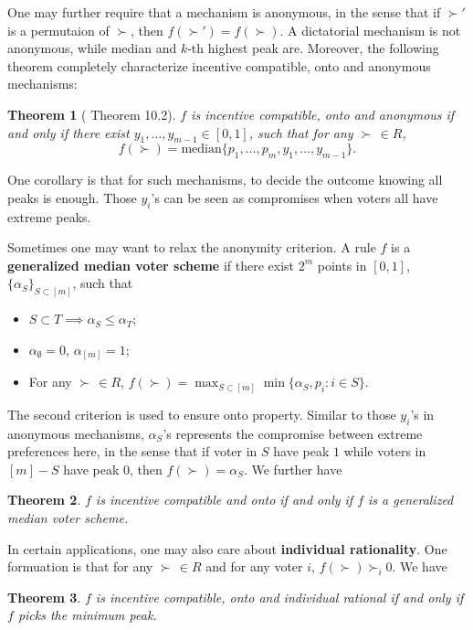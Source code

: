\documentclass[openany]{book}
\newtheorem{theorem}{Theorem}[chapter]
\theoremstyle{remark}
\begin{document}
One may further require that a mechanism is anonymous, in the sense that if $\succ'$ is a permutaion of $\succ$, then $f(\succ')=f(\succ)$. A dictatorial mechanism is not anonymous, while median and $k$-th highest peak are. Moreover, the following theorem completely characterize incentive compatible, onto and anonymous mechanisms:
\begin{theorem}[\cite{NRTV07} Theorem 10.2]
    $f$ is incentive compatible, onto and anonymous if and only if there exist $y_1,\ldots,y_{m-1}\in[0,1]$, such that for any $\succ\,\in R$,
    \begin{equation}
        f(\succ)=\mathrm{median}\{p_1,\ldots,p_m,y_1,\ldots,y_{m-1}\}.
    \end{equation}
\end{theorem}
One corollary is that for such mechanisms, to decide the outcome knowing all peaks is enough. Those $y_i$'s can be seen as compromises when voters all have extreme peaks.

Sometimes one may want to relax the anonymity criterion. A rule $f$ is a \textbf{generalized median voter scheme} if there exist $2^m$ points in $[0,1]$, $\{\alpha_S\}_{S\subset[m]}$, such that
\begin{itemize}
    \item $S\subset T\implies \alpha_S\le\alpha_T$;
    \item $\alpha_{\emptyset}=0$, $\alpha_{[m]}=1$;
    \item For any $\succ\,\in R$, $f(\succ)=\max_{S\subset[m]}\min\{\alpha_S,p_i:i\in S\}$.
\end{itemize}
The second criterion is used to ensure onto property. Similar to those $y_i$'s in anonymous mechanisms, $\alpha_S$'s represents the compromise between extreme preferences here, in the sense that if voter in $S$ have peak $1$ while voters in $[m]-S$ have peak $0$, then $f(\succ)=\alpha_S$. We further have
\begin{theorem}
    $f$ is incentive compatible and onto if and only if $f$ is a generalized median voter scheme.
\end{theorem}

In certain applications, one may also care about \textbf{individual rationality}. One formuation is that for any $\succ\,\in R$ and for any voter $i$, $f(\succ)\succ_i0$. We have
\begin{theorem}
    $f$ is incentive compatible, onto and individual rational if and only if $f$ picks the minimum peak.
\end{theorem}
\end{document}
